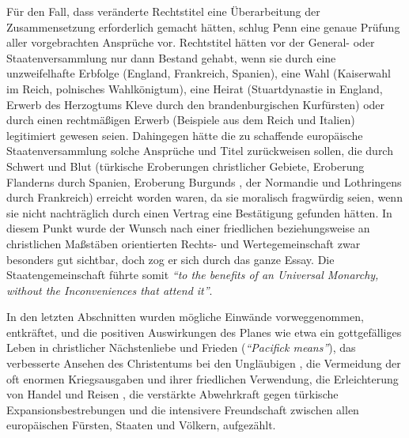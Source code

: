 \medskip

Für den Fall, dass veränderte Rechtstitel eine Überarbeitung der Zusammensetzung
erforderlich gemacht hätten, schlug Penn eine genaue Prüfung aller vorgebrachten
Ansprüche vor. Rechtstitel hätten vor der General- oder Staatenversammlung nur
dann Bestand gehabt, wenn sie durch eine unzweifelhafte Erbfolge (England,
Frankreich, Spanien), eine Wahl (Kaiserwahl im Reich, polnisches Wahlkönigtum),
eine Heirat (Stuartdynastie in England, Erwerb des Herzogtums
Kleve durch den brandenburgischen Kurfürsten) oder durch einen rechtmäßigen
Erwerb (Beispiele aus dem Reich und Italien) legitimiert gewesen seien.
Dahingegen hätte die zu schaffende europäische Staatenversammlung solche
Ansprüche und Titel zurückweisen sollen, die durch Schwert und Blut (türkische
Eroberungen christlicher Gebiete, Eroberung Flanderns 
durch Spanien, Eroberung Burgunds , der Normandie und
Lothringens  durch Frankreich) erreicht worden waren, da
sie moralisch fragwürdig seien, wenn sie nicht nachträglich durch einen Vertrag
eine Bestätigung gefunden hätten. In diesem Punkt wurde der Wunsch nach einer
friedlichen beziehungsweise an christlichen Maßstäben orientierten Rechts- und
Wertegemeinschaft zwar besonders gut sichtbar, doch zog er sich durch das ganze
Essay. Die Staatengemeinschaft führte somit \textit{"`to the benefits of an
Universal Monarchy, without the Inconveniences that attend it"'}.

\medskip

In den letzten Abschnitten wurden mögliche Einwände vorweggenommen, entkräftet,
und die positiven Auswirkungen des Planes wie etwa ein gottgefälliges Leben in
christlicher Nächstenliebe und Frieden (\textit{"`Pacifick means"'}), das
verbesserte Ansehen des Christentums  bei den Ungläubigen
, die Vermeidung der oft enormen
Kriegsausgaben und ihrer friedlichen Verwendung, die
Erleichterung von Handel  und Reisen , die
verstärkte Abwehrkraft gegen türkische Expansionsbestrebungen
 und die intensivere Freundschaft
zwischen allen europäischen Fürsten, Staaten und Völkern, aufgezählt.

\medskip

